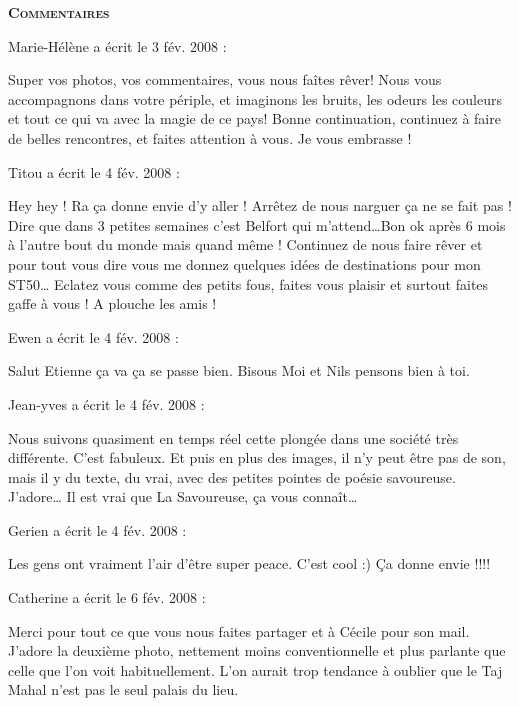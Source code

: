 \bigskip
\textbf{\textsc{Commentaires}}

\medskip
Marie-Hélène a écrit le 3 fév. 2008 :
\begin{displayquote}
Super vos photos, vos commentaires, vous nous faîtes rêver! Nous vous accompagnons dans votre périple, et imaginons les bruits, les odeurs les couleurs et tout ce qui va avec la magie de ce pays!
Bonne continuation, continuez à faire de belles rencontres, et faites attention à vous.
Je vous embrasse !
\end{displayquote}

\medskip
Titou a écrit le 4 fév. 2008 :
\begin{displayquote}
Hey hey ! Ra ça donne envie d'y aller ! Arrêtez de nous narguer ça ne se fait pas ! Dire que dans 3 petites semaines c'est Belfort qui m'attend\dots Bon ok après 6 mois à l'autre bout du monde mais quand même ! Continuez de nous faire rêver et pour tout vous dire vous me donnez quelques idées de destinations pour mon ST50\dots
Eclatez vous comme des petits fous, faites vous plaisir et surtout faites gaffe à vous ! A plouche les amis !
\end{displayquote}

\medskip
Ewen a écrit le 4 fév. 2008 :
\begin{displayquote}
Salut Etienne ça va ça se passe	bien.
Bisous Moi et Nils pensons bien à toi.
\end{displayquote}

\medskip
Jean-yves a écrit le 4 fév. 2008 :
\begin{displayquote}
Nous suivons quasiment en temps réel cette plongée dans une société très différente. C'est fabuleux. Et puis en plus des images, il n'y peut être pas de son, mais il y du texte, du vrai, avec des petites pointes de poésie savoureuse. J'adore\dots
Il est vrai que La Savoureuse, ça vous connaît\dots
\end{displayquote}

\medskip
Gerien a écrit le 4 fév. 2008 :
\begin{displayquote}
Les gens ont vraiment l'air d'être super peace. C'est cool :)
Ça donne envie !!!!
\end{displayquote}

\medskip
Catherine a écrit le 6 fév. 2008 :
\begin{displayquote}
Merci pour tout ce que vous nous faites partager et à Cécile pour son mail.
J'adore la deuxième photo, nettement moins conventionnelle et plus parlante que celle que l'on voit habituellement. L'on aurait trop tendance à oublier que le Taj Mahal n'est pas le seul palais du lieu.
\end{displayquote}

